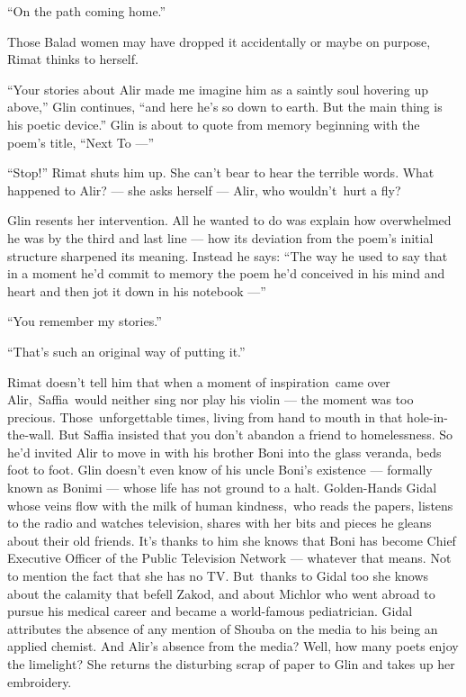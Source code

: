 \documentclass[twoside,11pt]{book}
\begin{document}
``On the path coming home.''

Those Balad women may have dropped it accidentally or maybe on purpose, Rimat thinks to
herself{. }

``Your stories about Alir made me imagine him as a
saintly soul hovering up above,'' Glin continues, ``and here he's so down to earth. But the
main thing is his poetic device.'' Glin is about to quote from memory beginning with the poem's title, ``Next To ---''


{{}``Stop!'' Rimat }shuts him
up{. She can't bear to hear the terrible words. What happened to
Alir? --- she asks herself --- Alir, who wouldn't~hurt a fly?}

{Glin }resents her intervention. All he wanted to do
was{ explain how overwhelmed he was by the third and last line --- how
its deviation from the poem's initial structure sharpened its meaning. Instead he says: {}``The way he used to say
that in a moment he'd commit to memory the poem }he'd conceived in his mind and heart
{and then jot it down in his notebook ---'' }

{}``You remember my stories.''

``That's such an original way of putting it.''

{Rimat doesn't tell him that when a moment of inspiration~came over
Alir,~Saffia~would neither sing nor play his violin --- the moment was too precious. Those~unforgettable times,
living from hand to mouth in that hole-in-the-wall. But Saffia insisted that you don't abandon a friend to
homelessness. So} he'd invited Alir to move in with his brother Boni into the glass veranda, beds foot to
foot. Glin doesn't even know of his uncle Boni's existence --- formally known as Bonimi --- whose life has not ground
to a halt. Golden-Hands Gidal whose veins flow with the milk of human kindness,~who reads the papers, listens to the
radio and watches television, shares with her bits and pieces he gleans about their old friends. It's thanks to him she
knows that Boni has become Chief Executive Officer of the Public Television Network --- whatever that means. Not to
mention the fact that she has no TV. But~thanks to Gidal too she knows about the calamity that befell Zakod, and about
Michlor who went abroad to pursue his medical career and became a world-famous pediatrician. Gidal attributes the
absence of any mention of Shouba on the media to his being an applied chemist. And Alir's absence from the media? Well,
how many poets enjoy the limelight? She returns the disturbing scr{ap
of paper to Glin and takes up her embroidery.}
\end{document}
